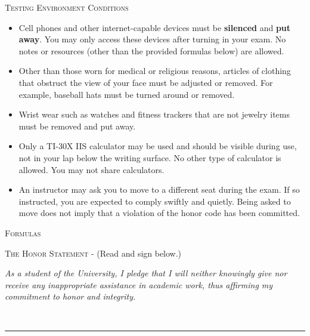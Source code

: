 \noindent \textsc{Testing Environment Conditions}
\begin{footnotesize}
\begin{itemize}
\item Cell phones and other internet-capable devices must be \textbf{silenced} and \textbf{put away}. You may only access these devices after turning in your exam. No notes or resources (other than the provided formulas below) are allowed.
\item Other than those worn for medical or religious reasons, articles of clothing that obstruct the view of your face must be adjusted or removed. For example, baseball hats must be turned around or removed.
\item Wrist wear such as watches and fitness trackers that are not jewelry items must be removed and put away.
\item Only a TI-30X IIS calculator may be used and should be visible during use, not in your lap below the writing surface. No other type of calculator is allowed. You may not share calculators.
\item An instructor may ask you to move to a different seat during the exam. If so instructed, you are expected to comply swiftly and quietly. Being asked to move does not imply that a violation of the honor code has been committed.\\
\end{itemize}
\end{footnotesize}

\noindent \textsc{Formulas}

\UnitOneFormulas %

\vfill

\noindent \textsc{The Honor Statement} - (Read and sign below.)\\
\begin{footnotesize}
\textit{As a student of the University, I pledge that I will neither knowingly give nor receive any inappropriate assistance in academic work, thus affirming my commitment to honor and integrity.}\\
\end{footnotesize}

 \ \rule{8.75 cm}{.01cm}\\
